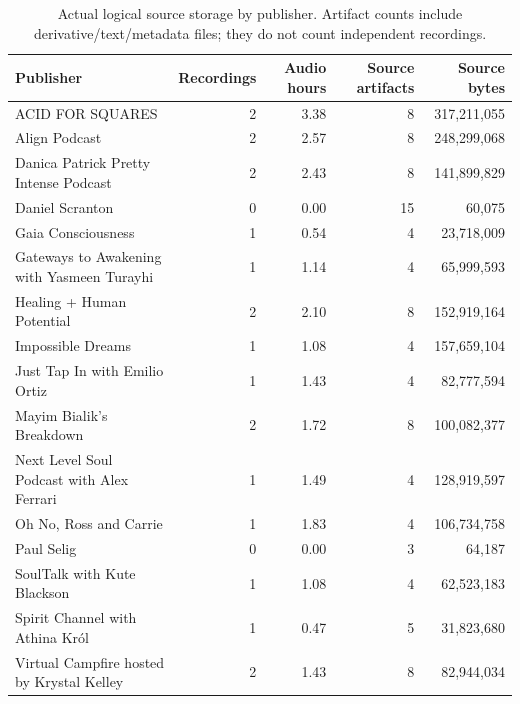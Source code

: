 \begin{table}[t]
\centering\small
\begin{tabular}{p{}rrrr}
\toprule
Publisher & Recordings & Audio hours & Source artifacts & Source bytes\\
\midrule
ACID FOR SQUARES & 2 & 3.38 & 8 & 317,211,055\\
Align Podcast & 2 & 2.57 & 8 & 248,299,068\\
Danica Patrick Pretty Intense Podcast & 2 & 2.43 & 8 & 141,899,829\\
Daniel Scranton & 0 & 0.00 & 15 & 60,075\\
Gaia Consciousness & 1 & 0.54 & 4 & 23,718,009\\
Gateways to Awakening with Yasmeen Turayhi & 1 & 1.14 & 4 & 65,999,593\\
Healing + Human Potential & 2 & 2.10 & 8 & 152,919,164\\
Impossible Dreams & 1 & 1.08 & 4 & 157,659,104\\
Just Tap In with Emilio Ortiz & 1 & 1.43 & 4 & 82,777,594\\
Mayim Bialik's Breakdown & 2 & 1.72 & 8 & 100,082,377\\
Next Level Soul Podcast with Alex Ferrari & 1 & 1.49 & 4 & 128,919,597\\
Oh No, Ross and Carrie & 1 & 1.83 & 4 & 106,734,758\\
Paul Selig & 0 & 0.00 & 3 & 64,187\\
SoulTalk with Kute Blackson & 1 & 1.08 & 4 & 62,523,183\\
Spirit Channel with Athina Król & 1 & 0.47 & 5 & 31,823,680\\
Virtual Campfire hosted by Krystal Kelley & 2 & 1.43 & 8 & 82,944,034\\
\bottomrule
\end{tabular}
\caption{Actual logical source storage by publisher. Artifact counts include derivative/text/metadata files; they do not count independent recordings.}
\end{table}
